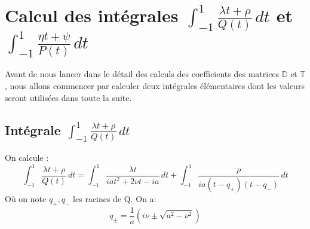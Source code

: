 \chapter{Calcul des intégrales $\int_{-1}^1 \frac{\lambda t+ \rho}{Q(t)}\, dt$ et $\int_{-1}^1 \frac{\eta t+ \psi}{P(t)}\, dt$ }
\label{Intégrale}
Avant de nous lancer dans le détail des calculs des coefficients des matrices $\mathbb{D}$ et $\mathbb{T}$, nous allons commencer par calculer deux intégrales élémentaires dont les valeurs seront utilisées dans toute la suite.
\section{Intégrale $\int_{-1}^1 \frac{\lambda t+ \rho}{Q(t)}\, dt$}
\label{calculIntQ}
On calcule :
\begin{equation*}
\int_{-1}^1 \frac{\lambda t+ \rho}{Q(t)}\, dt=\int_{-1}^1 \frac{\lambda t}{iat^2+2\nu t-ia}\,dt+\int_{-1}^1\frac{\rho}{ia(t-q_+)(t-q_-)}\,dt
\end{equation*}
Où on note $q_+,q_-$ les racines de Q. On a:
\begin{equation}
q_\pm=\frac{1}{a}(i\nu\pm\sqrt{a^2-\nu^2})
\label{q1q2}
\end{equation}

